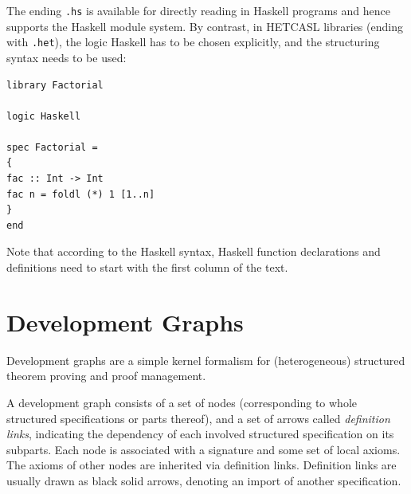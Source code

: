 \documentclass{article}
\newcommand{\eat}[1]{}
\newcommand{\normalTEXTSC}[2]{{#1\scriptsize#2}}
\newcommand{\CspCASL}{\normalTEXTSC{C}{SP}-\normalTEXTSC{C}{ASL}\xspace}
\newcommand{\Csp}{\normalTEXTSC{C}{SP}\xspace}
\newcommand{\HetCASL}{\normalTEXTSC{H}{ET}\normalTEXTSC{C}{ASL}\xspace}
\begin{document}
\eat{
A \CspCASL specification consists of a \CASL specification
for the data part and a \Csp process built over this data part.
Therefore, \HetCASL provides a heterogeneous language construct
\texttt{data} as follows:

\begin{verbatim}
library Buffer

logic CASL

spec List =
  free type List[Elem] ::= nil | cons(Elem; List[Elem])
  ops last: List -> ? Elem;
      rest: List -> ? List
end

logic CspCASL

spec Buffer =
  data List
  channel read, write : Elem
  process Buf(List): read, write, List;
          EmptyBuffer : read,write, List;
          Buf(l)= read? x :: Elem -> Buf(cons(x,nil)) []
                  (if l=nil then STOP else
                   write!last(l) -> Buf(rest(l)))
          EmptyBuffer = Buf(nil)
end
\end{verbatim}

Here, the construct \texttt{data List} refers to the \CASL specification
\texttt{List}, which is implicitly embedded into \CspCASL.
}

The ending \texttt{.hs} is available for directly reading in
Haskell programs %
and hence supports the Haskell module system.
By contrast, in \HetCASL libraries (ending with \texttt{.het}),
the logic Haskell has to be chosen explicitly, and the \CASL structuring
syntax needs to be used:

\begin{verbatim}
library Factorial

logic Haskell

spec Factorial =
{
fac :: Int -> Int
fac n = foldl (*) 1 [1..n]
}
end
\end{verbatim}

Note that according to the Haskell syntax, Haskell function
declarations and definitions need to start with the first column of
the text.




\section{Development Graphs}\label{sec:DevGraph}

Development graphs are a simple kernel formalism for (heterogeneous)
structured theorem proving and proof management.

A development graph consists of a set of nodes (corresponding to whole
structured specifications or parts thereof), and a set of arrows
called \emph{definition links}, indicating the dependency of each
involved structured specification on its subparts.  Each node is
associated with a signature and some set of local axioms.  The axioms
of other nodes are inherited via definition links.  Definition links
are usually drawn as black solid arrows, denoting an import of another
specification.
\end{document}
